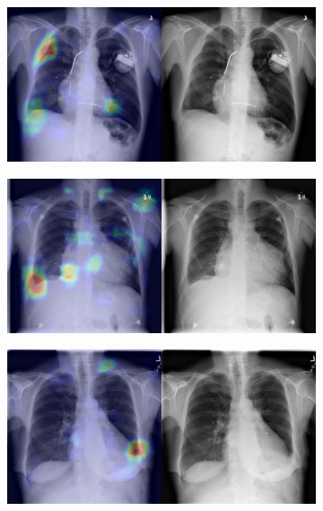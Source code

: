 \begin{figure}[b]
    \centering
    \begin{subfigure}{0.4\textwidth}
        \centering
        \includegraphics[width=1.0\textwidth]{Chapters/5. Conclusiones/img/Pleural-Thickening/1_1_00000013_043.png}
    \end{subfigure}
    \begin{subfigure}{0.4\textwidth}
        \centering
        \includegraphics[width=1.0\textwidth]{Chapters/5. Conclusiones/img/Pleural-Thickening/1_1_00000457_001.png}
    \end{subfigure}
    \begin{subfigure}{0.4\textwidth}
        \centering
        \includegraphics[width=1.0\textwidth]{Chapters/5. Conclusiones/img/Pleural-Thickening/1_1_00000732_008.png}

\end{subfigure}
\end{figure}
